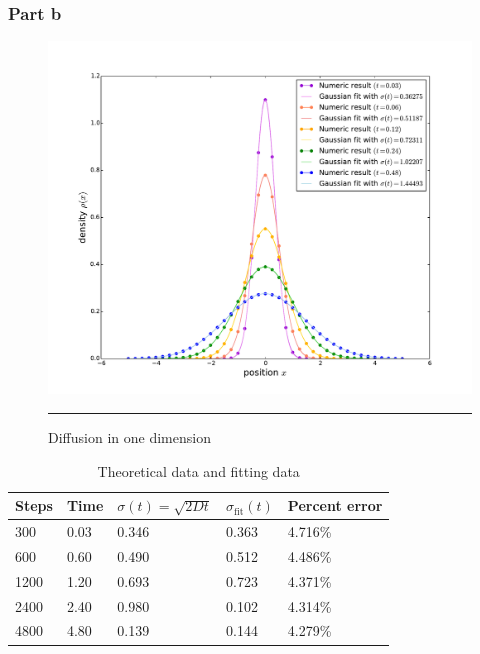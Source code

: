\documentclass[notitlepage,aps,prd,nofootinbib]{revtex4-1}
\begin{document}
\newpage
\subsubsection{Part b}
\label{subsubsec:results_2_b}
\begin{figure}[!htbc]
  \centering
  \includegraphics[width=.6\textwidth]{../output/plots_for_paper/problem_2/part_b.pdf}
  	{\par\nobreak\rule[9pt]{35em}{0.5pt}\vspace{-5mm}}
	\caption{Diffusion in one dimension}
	\label{fig:2}
\end{figure}

\begin{center}
	\begin{table}[!htbc]
		\begin{tabular}{ | p{2cm} | p{2cm} | p{2cm} | p{2cm} | p{2cm} |}
			\hline
			Steps & Time & $\sigma(t) = \sqrt{2Dt}$ & $\sigma_{\mathrm{fit}}(t)$ & Percent error\\
			\hline
			300  & 0.03 & 0.346 & 0.363 & 4.716\%\\
			\hline
			600  & 0.60 & 0.490 & 0.512 & 4.486\%\\ 
			\hline
			1200 & 1.20 & 0.693 & 0.723 & 4.371\%\\
			\hline
			2400 & 2.40 & 0.980 & 0.102 & 4.314\%\\
			\hline
			4800 & 4.80 & 0.139 & 0.144 & 4.279\%\\
			\hline
		\end{tabular}
		\caption{Theoretical data and fitting data}
		\label{table:prob_2}
	\end{table}
\end{center}

\clearpage
\end{document}
